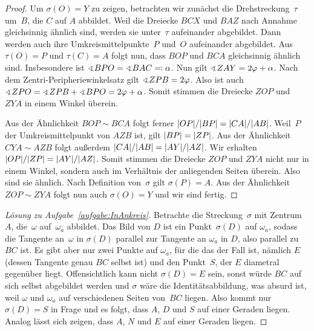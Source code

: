 \begin{proof}
	Um $\sigma(O)=Y$ zu zeigen, betrachten wir zunächst die Drehstreckung~$\tau$ um~$B$, die $C$ auf $A$ abbildet. Weil die Dreiecke $BCX$ und $BAZ$ nach Annahme gleichsinnig ähnlich sind, werden sie unter~$\tau$ aufeinander abgebildet. Dann werden auch ihre Umkreismittelpunkte~$P$ und~$O$ aufeinander abgebildet. Aus $\tau(O)=P$ und $\tau(C)=A$ folgt nun, dass $BOP$ und $BCA$ gleichsinnig ähnlich sind. Insbesondere ist $\winkel BPO=\winkel BAC\eqqcolon\alpha$. Nun gilt $\winkel ZAY=2\varphi+\alpha$. Nach dem Zentri-Peripheriewinkelsatz gilt $\winkel ZPB=2\varphi$. Also ist auch $\winkel ZPO=\winkel ZPB+\winkel BPO=2\varphi+\alpha$. Somit stimmen die Dreiecke $ZOP$ und $ZYA$ in einem Winkel überein.
	
	Aus der Ähnlichkeit $BOP\sim BCA$ folgt ferner $\abs*{OP}/\abs*{BP}=\abs*{CA}/\abs*{AB}$. Weil~$P$ der Umkreismittelpunkt von $AZB$ ist, gilt $\abs*{BP}=\abs*{ZP}$. Aus der Ähnlichkeit $CYA\sim AZB$ folgt außerdem $\abs*{CA}/\abs{AB}=\abs*{AY}/\abs*{AZ}$. Wir erhalten $\abs{OP}/\abs{ZP}=\abs{AY}/\abs{AZ}$. Somit stimmen die Dreiecke $ZOP$ und $ZYA$ nicht nur in einem Winkel, sondern auch im Verhältnis der anliegenden Seiten überein. Also sind sie ähnlich. Nach Definition von~$\sigma$ gilt $\sigma(P)=A$. Aus der Ähnlichkeit $ZOP\sim ZYA$ folgt nun auch $\sigma(O)=Y$ und wir sind fertig.
\end{proof}
\begin{proof}[Lösung zu Aufgabe~\ref{aufgabe:InAnkreis}]
	Betrachte die Streckung~$\sigma$ mit Zentrum~$A$, die~$\omega$ auf~$\omega_a$ abbildet. Das Bild von $D$ ist ein Punkt~$\sigma(D)$ auf $\omega_a$, sodass die Tangente an~$\omega$ in $\sigma(D)$ parallel zur Tangente an $\omega_a$ in $D$, also parallel zu $BC$ ist. Es gibt aber nur zwei Punkte auf $\omega_a$, für die das der Fall ist, nämlich $E$ (dessen Tangente genau $BC$ selbst ist) und den Punkt~$S$, der $E$ diametral gegenüber liegt. Offensichtlich kann nicht $\sigma(D)=E$ sein, sonst würde $BC$ auf sich selbst abgebildet werden und $\sigma$ wäre die Identitätsabbildung, was absurd ist, weil $\omega$ und $\omega_a$ auf verschiedenen Seiten von~$BC$ liegen. Also kommt nur $\sigma(D)=S$ in Frage und es folgt, dass $A$, $D$ und $S$ auf einer Geraden liegen. Analog lässt sich zeigen, dass $A$, $N$ und $E$ auf einer Geraden liegen.
\end{proof}

